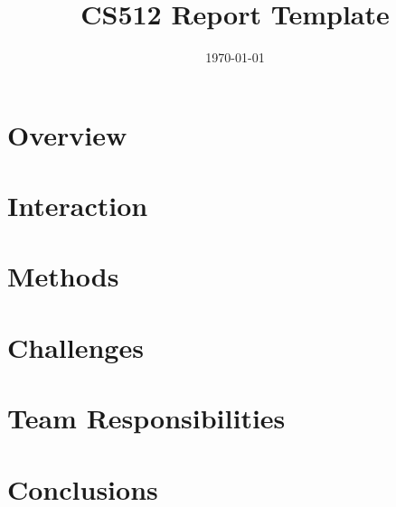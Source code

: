 \documentclass[12pt]{article}
\title{CS512 Report Template}
\author{}
\date{\today}
\begin{document}
\maketitle

\section{Overview}

\section{Interaction}

\section{Methods}

\section{Challenges}

\section{Team Responsibilities}

\section{Conclusions}
% 

\end{document}
